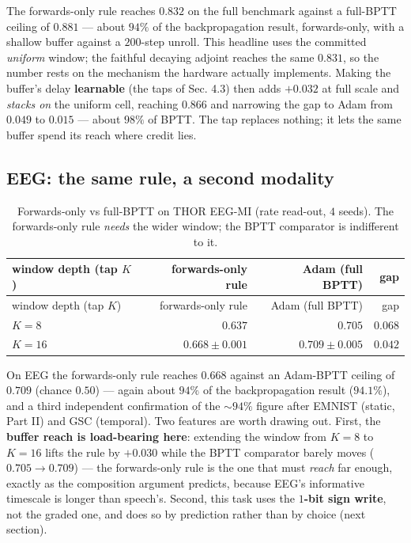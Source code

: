 \documentclass[11pt]{article}
\begin{document}
The forwards-only rule reaches \(0.832\) on the full benchmark against a
full-BPTT ceiling of \(0.881\) --- about \(94\%\) of the backpropagation
result, forwards-only, with a shallow buffer against a \(200\)-step
unroll. This headline uses the committed \emph{uniform} window; the
faithful decaying adjoint reaches the same \(0.831\), so the number
rests on the mechanism the hardware actually implements. Making the
buffer's delay \textbf{learnable} (the taps of Sec. 4.3) then adds
\(+0.032\) at full scale and \emph{stacks on} the uniform cell, reaching
\(0.866\) and narrowing the gap to Adam from \(0.049\) to \(0.015\) ---
about \(98\%\) of BPTT. The tap replaces nothing; it lets the same
buffer spend its reach where credit lies.

\hypertarget{eeg-the-same-rule-a-second-modality}{%
\subsection{EEG: the same rule, a second
modality}\label{eeg-the-same-rule-a-second-modality}}

\begin{longtable}[]{@{}lrrr@{}}
\caption{Forwards-only vs full-BPTT on THOR EEG-MI (rate read-out, \(4\)
seeds). The forwards-only rule \emph{needs} the wider window; the BPTT
comparator is indifferent to it.}\tabularnewline
\toprule\noalign{}
window depth (tap \(K\)) & forwards-only rule & Adam (full BPTT) &
gap \\
\midrule\noalign{}
\endfirsthead
\toprule\noalign{}
window depth (tap \(K\)) & forwards-only rule & Adam (full BPTT) &
gap \\
\midrule\noalign{}
\endhead
\bottomrule\noalign{}
\endlastfoot
\(K=8\) & \(0.637\) & \(0.705\) & \(0.068\) \\
\(K=16\) & \textbf{\(0.668 \pm 0.001\)} & \textbf{\(0.709 \pm 0.005\)} &
\(0.042\) \\
\end{longtable}

On EEG the forwards-only rule reaches \(0.668\) against an Adam-BPTT
ceiling of \(0.709\) (chance \(0.50\)) --- again about \(94\%\) of the
backpropagation result (\(94.1\%\)), and a third independent
confirmation of the \({\sim}94\%\) figure after EMNIST (static, Part II)
and GSC (temporal). Two features are worth drawing out. First, the
\textbf{buffer reach is load-bearing here}: extending the window from
\(K=8\) to \(K=16\) lifts the rule by \(+0.030\) while the BPTT
comparator barely moves (\(0.705\to0.709\)) --- the forwards-only rule
is the one that must \emph{reach} far enough, exactly as the composition
argument predicts, because EEG's informative timescale is longer than
speech's. Second, this task uses the \textbf{\(1\)-bit sign write}, not
the graded one, and does so by prediction rather than by choice (next
section).
\end{document}
